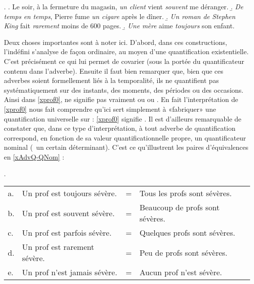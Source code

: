 \ex. \label{xAdvQindef2}
\a. Le soir, à la fermeture du magasin, \emph{un client} vient
\emph{souvent} me  déranger.
\b. \emph{De temps en temps}, Pierre fume \emph{un cigare} après le
dîner. 
\b. \emph{Un roman de Stephen King} fait \emph{rarement} moins de 600 pages.
\b. \emph{Une mère} aime \emph{toujours} son enfant.%
\label{xprof0} 


Deux choses importantes sont à noter ici. D'abord, dans ces
constructions, l'indéfini s'analyse de façon ordinaire, au moyen d'une
quantification existentielle. C'est précisément ce qui lui permet de
covarier (sous la portée du quantificateur contenu dans l'adverbe).
Ensuite il faut bien remarquer que, bien que ces adverbes soient
formellement liés à la temporalité, ils ne quantifient pas
systématiquement sur des instants, des moments, des périodes ou des
occasions.  Ainsi dans \ref{xprof0},  ne signifie pas
vraiment  ou  ou . 
En fait l'interprétation de \ref{xprof0} nous fait comprendre qu'ici
 sert simplement à «fabriquer» une
quantification universelle sur  : \ref{xprof0} signifie
.  Il est d'ailleurs remarquable de
constater que, dans ce type d'interprétation, à tout adverbe de
quantification correspond, en fonction de sa valeur
quantificationnelle propre, un quantificateur nominal (\ie\ un
certain déterminant). C'est ce
qu'illustrent les paires d'équivalences en \ref{xAdvQ-QNom} : 

\ex.  \label{xAdvQ-QNom}
\begin{tabular}[t]{@{}llll}
a. & Un prof est toujours sévère. & = & Tous les profs sont sévères.\\
b. & Un prof est souvent sévère. & = & {Beaucoup\footnotemark} de profs sont sévères.\\
c. & Un prof est parfois sévère. & = & Quelques profs sont sévères.\\
d. & Un prof est rarement sévère. & = & Peu de profs sont sévères.\\
e. & Un prof n'est jamais sévère. & = & Aucun prof n'est sévère.\\
\end{tabular}%

